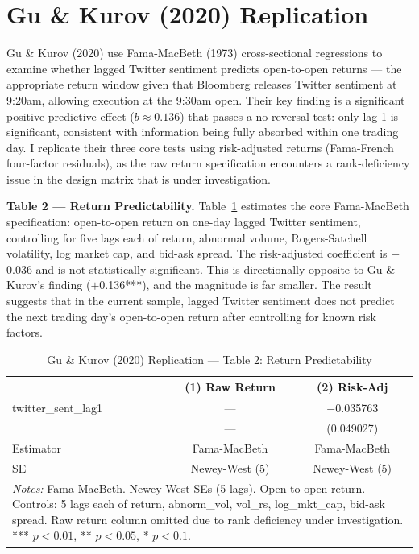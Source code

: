 \documentclass[12pt]{article}
\begin{document}
\newpage
\section{Gu \& Kurov (2020) Replication}

Gu \& Kurov (2020) use Fama-MacBeth (1973) cross-sectional regressions to examine whether lagged Twitter sentiment predicts open-to-open returns --- the appropriate return window given that Bloomberg releases Twitter sentiment at 9:20am, allowing execution at the 9:30am open. Their key finding is a significant positive predictive effect ($b \approx 0.136$) that passes a no-reversal test: only lag 1 is significant, consistent with information being fully absorbed within one trading day. I replicate their three core tests using risk-adjusted returns (Fama-French four-factor residuals), as the raw return specification encounters a rank-deficiency issue in the design matrix that is under investigation.

\textbf{Table 2 --- Return Predictability.} Table~\ref{tab:gk_t2} estimates the core Fama-MacBeth specification: open-to-open return on one-day lagged Twitter sentiment, controlling for five lags each of return, abnormal volume, Rogers-Satchell volatility, log market cap, and bid-ask spread. The risk-adjusted coefficient is $-$0.036 and is not statistically significant. This is directionally opposite to Gu \& Kurov's finding ($+$0.136***), and the magnitude is far smaller. The result suggests that in the current sample, lagged Twitter sentiment does not predict the next trading day's open-to-open return after controlling for known risk factors.

\begin{table}[htbp]
\centering
\caption{Gu \& Kurov (2020) Replication --- Table 2: Return Predictability}
\label{tab:gk_t2}
\begin{tabular}{lcc}
\hline\hline
 & (1) Raw Return & (2) Risk-Adj \\
\hline
twitter\_sent\_lag1 & --- & $-$0.035763 \\
 & --- & (0.049027) \\
\hline
Estimator & Fama-MacBeth & Fama-MacBeth \\
SE & Newey-West (5) & Newey-West (5) \\
\hline\hline
\multicolumn{3}{p{0.9\linewidth}}{\footnotesize \textit{Notes:} Fama-MacBeth. Newey-West SEs (5 lags). Open-to-open return. Controls: 5 lags each of return, abnorm\_vol, vol\_rs, log\_mkt\_cap, bid-ask spread. Raw return column omitted due to rank deficiency under investigation. *** $p<0.01$, ** $p<0.05$, * $p<0.1$.}
\end{tabular}
\end{table}
\end{document}
